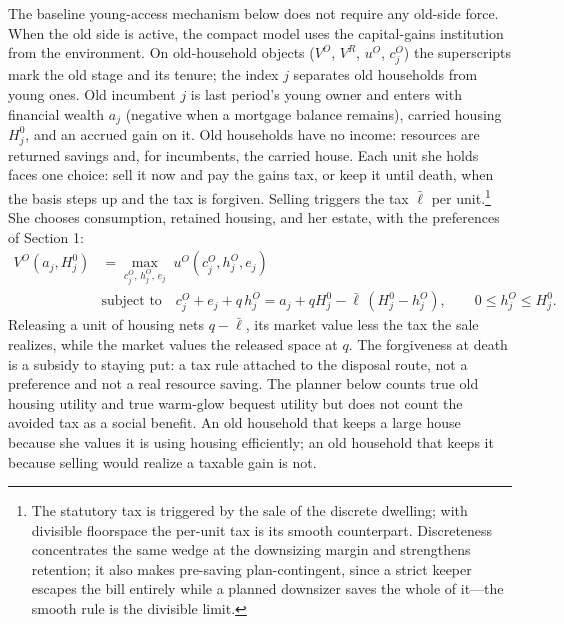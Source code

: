 \documentclass[11pt]{article}
\newcommand{\1}{\mathbf 1}
\begin{document}
The baseline young-access mechanism below does not require any old-side force. When the old side is active, the compact model uses the capital-gains institution from the environment. On old-household objects ($V^O$, $V^R$, $u^O$, $c_j^O$) the superscripts mark the old stage and its tenure; the index $j$ separates old households from young ones. Old incumbent $j$ is last period's young owner and enters with financial wealth $a_j$ (negative when a mortgage balance remains), carried housing $H_j^0$, and an accrued gain on it. Old households have no income: resources are returned savings and, for incumbents, the carried house. Each unit she holds faces one choice: sell it now and pay the gains tax, or keep it until death, when the basis steps up and the tax is forgiven. Selling triggers the tax $\bar\ell$ per unit.\footnote{The statutory tax is triggered by the sale of the discrete dwelling; with divisible floorspace the per-unit tax is its smooth counterpart. Discreteness concentrates the same wedge at the downsizing margin and strengthens retention; it also makes pre-saving plan-contingent, since a strict keeper escapes the bill entirely while a planned downsizer saves the whole of it---the smooth rule is the divisible limit.} She chooses consumption, retained housing, and her estate, with the preferences of Section 1:
\begin{equation}
\begin{aligned}
V^O(a_j,H_j^0)
&=
\max_{c_j^O,\,h_j^O,\,e_j}\;
u^O(c_j^O,h_j^O,e_j)
\\
&\text{subject to}\quad
c_j^O+e_j+q\,h_j^O
=
a_j+q H_j^0-\bar\ell\,(H_j^0-h_j^O),
\qquad
0\le h_j^O\le H_j^0.
\end{aligned}
\label{eq:compact_old_budget}
\end{equation}
Releasing a unit of housing nets $q-\bar\ell$, its market value less the tax the sale realizes, while the market values the released space at $q$. The forgiveness at death is a subsidy to staying put: a tax rule attached to the disposal route, not a preference and not a real resource saving. The planner below counts true old housing utility and true warm-glow bequest utility but does not count the avoided tax as a social benefit. An old household that keeps a large house because she values it is using housing efficiently; an old household that keeps it because selling would realize a taxable gain is not.
\end{document}
